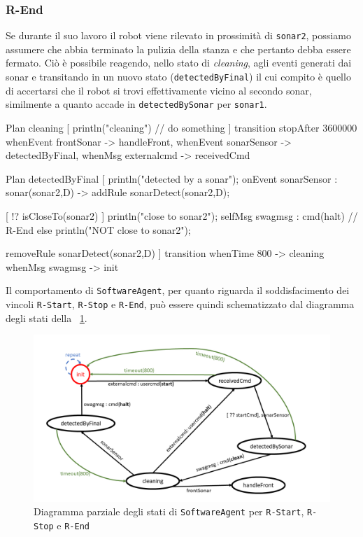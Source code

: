 \documentclass{../llncs}
\newcommand{\codescript}[1]{{\mbox{\small{\texttt{#1}}}}\xspace}
\newcommand{\code}[1]{{\color{blue}\small{\texttt{#1}}}}
\newcommand{\labelfig}[1]{\label{fig:#1}}
\newcommand{\xf}[1]{\figurename~\ref{fig:#1}}
\begin{document}

\subsubsection{R-End}
Se durante il suo lavoro il robot viene rilevato in prossimità di \code{sonar2}, possiamo assumere che abbia terminato la pulizia della stanza e che pertanto debba essere fermato. Ciò è possibile reagendo, nello stato di \emph{cleaning}, agli eventi generati dai sonar e transitando in un nuovo stato (\codescript{detectedByFinal}) il cui compito è quello di accertarsi che il robot si trovi effettivamente vicino al secondo sonar, similmente a quanto accade in \codescript{detectedBySonar} per \code{sonar1}.\\

\begin{qacode}[caption={SoftwareAgent, pt3}]
Plan cleaning [
	println("cleaning")
	// do something
]
transition stopAfter 3600000 
	whenEvent frontSonar -> handleFront,
	whenEvent sonarSensor -> detectedByFinal,
	whenMsg externalcmd -> receivedCmd
\end{qacode}

\begin{qacode}[caption={SoftwareAgent, pt4}]
Plan detectedByFinal [
	println("detected by a sonar");
	onEvent sonarSensor : sonar(sonar2,D) -> addRule sonarDetect(sonar2,D);

	[ !? isCloseTo(sonar2) ] {
		println("close to sonar2");
		selfMsg swagmsg : cmd(halt) // R-End
	}
	else
		println("NOT close to sonar2");
	
	removeRule sonarDetect(sonar2,D)
]
transition
	whenTime 800 -> cleaning
	whenMsg swagmsg -> init
\end{qacode}

Il comportamento di \texttt{SoftwareAgent}, per quanto riguarda il soddisfacimento dei vincoli \code{R-Start}, \code{R-Stop} e \code{R-End}, può essere quindi schematizzato dal diagramma degli stati della \xf{fsmStartStopEnd}.

\begin{figure}[!htb]
\centering
\includegraphics[scale=0.4]{img/stateDiagramStartStopEnd.png}
\caption{Diagramma parziale degli stati di \texttt{SoftwareAgent} per \code{R-Start}, \code{R-Stop} e \code{R-End}}\labelfig{fsmStartStopEnd}
\end{figure}
\end{document}
